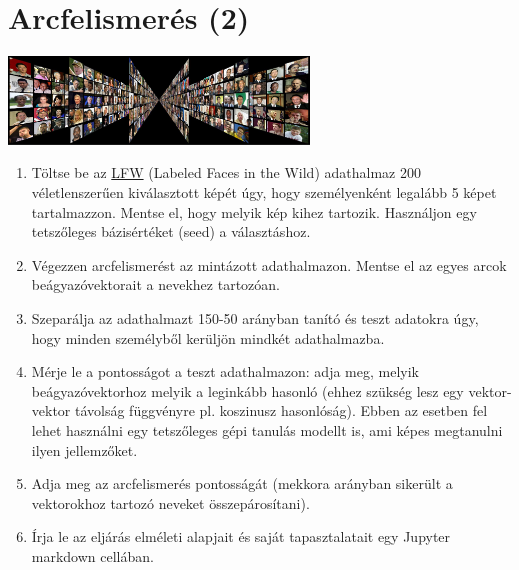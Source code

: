 \documentclass[english]{article}
\begin{document}
\section{Arcfelismerés (2)}
\begin{center}
\includegraphics[width=8cm, keepaspectratio]{images/lfw.jpg}
\end{center}
\begin{enumerate}
	\item Töltse be az \href{http://vis-www.cs.umass.edu/lfw/#download}{LFW} (Labeled Faces in the Wild) adathalmaz 200 véletlenszerűen kiválasztott képét úgy, hogy személyenként legalább 5 képet tartalmazzon. Mentse el, hogy melyik kép kihez tartozik. Használjon egy tetszőleges bázisértéket (seed) a választáshoz.
	\item Végezzen arcfelismerést az mintázott adathalmazon. Mentse el az egyes arcok beágyazóvektorait a nevekhez tartozóan. 
	\item Szeparálja az adathalmazt 150-50 arányban tanító és teszt adatokra úgy, hogy minden személyből kerüljön mindkét adathalmazba.
	\item Mérje le a pontosságot a teszt adathalmazon: adja meg, melyik beágyazóvektorhoz melyik a leginkább hasonló (ehhez szükség lesz egy vektor-vektor távolság függvényre pl. koszinusz hasonlóság). Ebben az esetben fel lehet használni egy tetszőleges gépi tanulás modellt is, ami képes megtanulni ilyen jellemzőket. 
	\item Adja meg az arcfelismerés pontosságát (mekkora arányban sikerült a vektorokhoz tartozó neveket összepárosítani).
	\item Írja le az eljárás elméleti alapjait és saját tapasztalatait egy Jupyter markdown cellában.
\end{enumerate}
\end{document}
